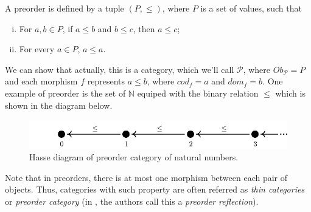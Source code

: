 \begin{example}[Preorders]
	A preorder is defined by a tuple $(P, \leq)$, where $P$ is a set of values, such that
	\begin{enumerate}[(i)]
		\item For $a,b \in P$, if $a\leq b$ and $b \leq c$, then $a \leq c$;
		\item For every $a \in P$, $a \leq a$.
	\end{enumerate}
	We can show that actually, this is a category, which we'll call $\mathcal P$,
	where $Ob_\mathcal P = P$ and each morphism $f$ represents $a \leq b$, where
	$cod_f = a$ and $dom_f = b$.
	One example of preorder is the set of $\mathbb N$ equiped with the binary relation $\leq$
	which is shown in the diagram below.

	\begin{figure}[H]
		\begin{center}
			\includegraphics{./notebooks/NCat}
		\end{center}
		\caption{Hasse diagram of preorder category of natural numbers.}
		\label{fig:NCat}
	\end{figure}
\end{example}

Note that in preorders, there is at most one morphism between each pair of objects.
Thus, categories with such property are often referred as \textit{thin categories}
or \textit{preorder category} (in \citet{fong2019invitation}, the authors call this
a \textit{preorder reflection}).

